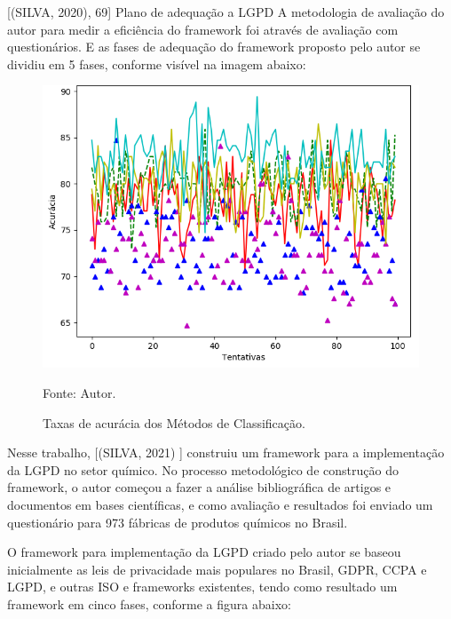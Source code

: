 \documentclass[
	12pt,				%
	openright,			%
	oneside,			%
	a4paper,			%
	english,			%
	french,				%
	spanish,			%
	brazil,				%
	]{abntex2}
\begin{document}
[(SILVA, 2020), 69] Plano de adequação a LGPD
A metodologia de avaliação do autor para medir a eficiência do framework foi através de avaliação com questionários. E as fases de adequação do framework proposto pelo autor se dividiu em 5 fases, conforme visível na imagem abaixo: 

\begin{figure}[ht]
    \centering
    \caption{Taxas de acurácia dos Métodos de Classificação.}
    \includegraphics[width=5.0in]{Images/acc-classification.png}
    \label{fig: grafico-acc}
    
    \centering \small Fonte: Autor.
\end{figure}

Nesse trabalho, [(SILVA, 2021) ] construiu um framework para a implementação da LGPD no setor químico. No processo metodológico de construção do framework, o autor começou a fazer a análise bibliográfica de artigos e documentos em bases científicas, e como avaliação e resultados foi enviado um questionário para 973 fábricas de produtos químicos no Brasil.

O framework para implementação da LGPD criado pelo autor se baseou inicialmente as leis de privacidade mais populares no Brasil, GDPR, CCPA e LGPD, e outras ISO e frameworks existentes, tendo como resultado um framework em cinco fases, conforme a figura abaixo:
\end{document}
